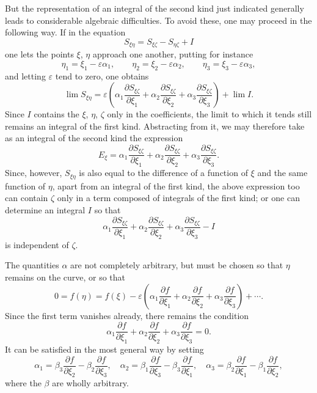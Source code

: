 \documentclass[10pt]{article}
\begin{document}
But the representation of an integral of the second kind just indicated generally leads to considerable algebraic difficulties. To avoid these, one may proceed in the following way. If in the equation
\[
S_{\xi\eta}=S_{\xi\zeta}-S_{\eta\zeta}+I
\]
one lets the points $\xi$, $\eta$ approach one another, putting for instance
\[
\eta_1=\xi_1-\varepsilon\alpha_1,
\qquad
\eta_2=\xi_2-\varepsilon\alpha_2,
\qquad
\eta_3=\xi_3-\varepsilon\alpha_3,
\]
and letting $\varepsilon$ tend to zero, one obtains
\[
\lim S_{\xi\eta}=\varepsilon\left(\alpha_1\frac{\partial S_{\xi\zeta}}{\partial \xi_1}+\alpha_2\frac{\partial S_{\xi\zeta}}{\partial \xi_2}+\alpha_3\frac{\partial S_{\xi\zeta}}{\partial \xi_3}\right)+\lim I.
\]
Since $I$ contains the $\xi$, $\eta$, $\zeta$ only in the coefficients, the limit to which it tends still remains an integral of the first kind. Abstracting from it, we may therefore take as an integral of the second kind the expression
\[
E_\xi=\alpha_1\frac{\partial S_{\xi\zeta}}{\partial \xi_1}+\alpha_2\frac{\partial S_{\xi\zeta}}{\partial \xi_2}+\alpha_3\frac{\partial S_{\xi\zeta}}{\partial \xi_3}.
\]
Since, however, $S_{\xi\eta}$ is also equal to the difference of a function of $\xi$ and the same function of $\eta$, apart from an integral of the first kind, the above expression too can contain $\zeta$ only in a term composed of integrals of the first kind; or one can determine an integral $I$ so that
\[
\alpha_1\frac{\partial S_{\xi\zeta}}{\partial \xi_1}+\alpha_2\frac{\partial S_{\xi\zeta}}{\partial \xi_2}+\alpha_3\frac{\partial S_{\xi\zeta}}{\partial \xi_3}-I
\]
is independent of $\zeta$.

The quantities $\alpha$ are not completely arbitrary, but must be chosen so that $\eta$ remains on the curve, or so that
\[
0=f(\eta)=f(\xi)-\varepsilon\left(\alpha_1\frac{\partial f}{\partial \xi_1}+\alpha_2\frac{\partial f}{\partial \xi_2}+\alpha_3\frac{\partial f}{\partial \xi_3}\right)+\cdots .
\]
Since the first term vanishes already, there remains the condition
\[
\alpha_1\frac{\partial f}{\partial \xi_1}+\alpha_2\frac{\partial f}{\partial \xi_2}+\alpha_3\frac{\partial f}{\partial \xi_3}=0.
\]
It can be satisfied in the most general way by setting
\[
\alpha_1=\beta_3\frac{\partial f}{\partial \xi_2}-\beta_2\frac{\partial f}{\partial \xi_3},
\quad
\alpha_2=\beta_1\frac{\partial f}{\partial \xi_3}-\beta_3\frac{\partial f}{\partial \xi_1},
\quad
\alpha_3=\beta_2\frac{\partial f}{\partial \xi_1}-\beta_1\frac{\partial f}{\partial \xi_2},
\]
where the $\beta$ are wholly arbitrary.
\end{document}
